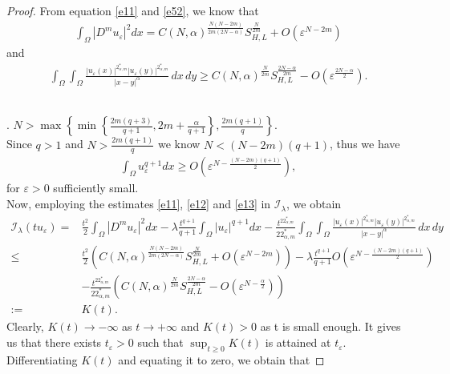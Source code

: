 \documentclass[reqno]{amsart}
\newcommand{\la} {\lambda}
\newcommand{\eps}{\varepsilon}
\newcommand{\Om}{\Omega}
\newcommand{\al} {\alpha}
\newcommand{\mc} {\mathcal}
\numberwithin{theorem}{section} \numberwithin{equation}{section}
\begin{document}
\begin{proof}

From equation \eqref{e11} and \eqref{e52}, we know that
\begin{align*}
\int_{\Om}\left|D^m u_{\eps}\right|^2 dx = C(N, \al)^{\frac{N(N-2m)}{2m(2N-\al)}} S_{H, L}^{\frac{N}{2m}}+O\left(\eps^{N-2m}\right)
\end{align*}
and
\begin{align}\label{e12}
\int_{\Om} \int_{\Om} \frac{\left|u_{\eps}(x)\right|^{2_{\al, m}^*}\left|u_{\eps}(y)\right|^{2_{\al, m}^*}}{|x-y|^\al} \, dx \, dy \geq C(N, \al)^{\frac{N}{2m}} S_{H, L}^{\frac{2N-\al}{2m}}-O\left(\eps^{\frac{2N-\al}{2}}\right).
\end{align}\\
\item[Case 1].
$N>\max \left\{\min \left\{\frac{2m(q+3)}{q+1}, 2m+\frac{\al}{q+1}\right\}, \frac{2m(q+1)}{q}\right\}$.\\
Since $q>1$ and $N>\frac{2m(q+1)}{q}$ we know $N<(N-2m)(q+1)$, thus we have
\begin{align}\label{e13}
\int_{\Om} u_{\eps}^{q+1} dx \geq O\left(\eps^{N-\frac{(N-2m)(q+1)}{2}}\right),\end{align}
for $\eps>0$ sufficiently small.\\
Now, employing the estimates  \eqref{e11}, \eqref{e12} and \eqref{e13} in $\mc{I_\la}$, we obtain
\begin{align*}
\mc{I_\la}\left(t u_{\eps}\right)= & \frac{t^2}{2} \int_{\Om}\left|D^m u_{\eps}\right|^2 d x-\la \frac{t^{q+1}}{q+1} \int_{\Om}\left|u_{\eps}\right|^{q+1} d x-\frac{t^{22_{\al, m}^*}}{22_{\al, m}^*} \int_{\Om} \int_{\Om} \frac{\left|u_{\eps}(x)\right|^{2_{\al, m}^*}\left|u_{\eps}(y)\right|^{2_{\al, m}^*}}{|x-y|^\al} \, dx \, dy \\
\leq & \frac{t^2}{2}\left(C(N, \al)^{\frac{N(N-2m)}{2m(2N-\al)}} S_{H, L}^{\frac{N}{2m}}+O\left(\eps^{N-2m}\right)\right)-\la\frac{t^{q+1}}{q+1} O\left(\eps^{N-\frac{(N-2m)(q+1)}{2}}\right) \\
& -\frac{t^{22_{\al, m}^*}}{22_{\al, m}^*}\left(C(N, \al)^{\frac{N}{2m}} S_{H, L}^{\frac{2N-\al}{2m}}-O\left(\eps^{N-\frac{\al}{2}}\right)\right) \\
:= &  K(t).
\end{align*}
Clearly, $ K(t) \rightarrow-\infty$ as $t \rightarrow+\infty$ and $K(t)>0$ as t is small enough. It gives us that there exists $t_{\eps}>0$ such that 
$\displaystyle \sup_{t \geq 0}K(t)$ is attained at $t_{\eps}$. Differentiating $K(t)$ and equating it to zero, we obtain that

\end{proof}
\end{document}
